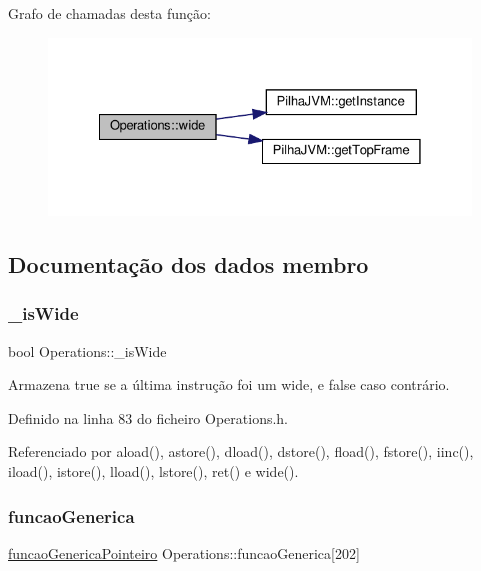 Grafo de chamadas desta função\+:\nopagebreak
\begin{figure}[H]
\begin{center}
\leavevmode
\includegraphics[width=328pt]{classOperations_ab1474dfc4eb5142361b00d185f0a4a2b_cgraph}
\end{center}
\end{figure}


\subsection{Documentação dos dados membro}
\mbox{\label{classOperations_ab20aea5d0327c8100d12b217ecbbd62c}} 
\subsubsection{\texorpdfstring{\+\_\+is\+Wide}{\_isWide}}
{\footnotesize\ttfamily bool Operations\+::\+\_\+is\+Wide\hspace{0.3cm}{\ttfamily [private]}}

Armazena {\ttfamily true} se a última instrução foi um wide, e {\ttfamily false} caso contrário. 

Definido na linha 83 do ficheiro Operations.\+h.



Referenciado por aload(), astore(), dload(), dstore(), fload(), fstore(), iinc(), iload(), istore(), lload(), lstore(), ret() e wide().

\mbox{\label{classOperations_a5576f742afb9d43d3ea33f2ddd33fd43}} 
\subsubsection{\texorpdfstring{funcao\+Generica}{funcaoGenerica}}
{\footnotesize\ttfamily \hyperlink{Operations_8h_a40aa26aea6df6f70ca74e7547328d316}{funcao\+Generica\+Pointeiro} Operations\+::funcao\+Generica\mbox{[}202\mbox{]}\hspace{0.3cm}{\ttfamily [private]}}

